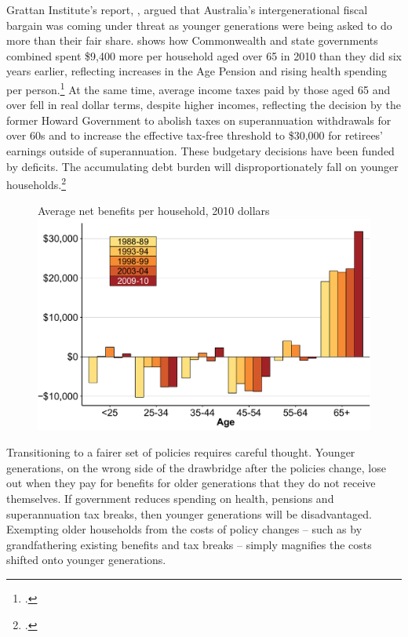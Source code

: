 \documentclass{grattanAlpha}
\begin{document}
Grattan Institute’s report, , argued that Australia’s intergenerational fiscal bargain was coming under threat as younger generations were being asked to do more than their fair share.  shows how Commonwealth and state governments combined spent \$9,400 more per household aged over 65 in 2010 than they did six years earlier, reflecting increases in the Age Pension and rising health spending per person.\footcite[][22]{DaleyWoodWeidmannEtAl2014}  At the same time, average income taxes paid by those aged 65 and over fell in real dollar terms, despite higher incomes, reflecting the decision by the former Howard Government to abolish taxes on superannuation withdrawals for over 60s and to increase the effective tax-free threshold to \$30,000 for retirees’ earnings outside of superannuation. These budgetary decisions have been funded by deficits. The accumulating debt burden will disproportionately fall on younger households.\footcite[][29]{DaleyWoodWeidmannEtAl2014}

\begin{figure}
%
{Average net benefits per household, 2010 dollars}\label{fig:SUPER-Wealth-of-generations-chart}
\includegraphics[width=\columnwidth]{super-atlas/Figure1-1.pdf}

\end{figure}
Transitioning to a fairer set of policies requires careful thought. Younger generations, on the wrong side of the drawbridge after the policies change, lose out when they pay for benefits for older generations that they do not receive themselves. If government reduces spending on health, pensions and superannuation tax breaks, then younger generations will be disadvantaged. Exempting older households from the costs of policy changes – such as by grandfathering existing benefits and tax breaks – simply magnifies the costs shifted onto younger generations. 
\end{document}
